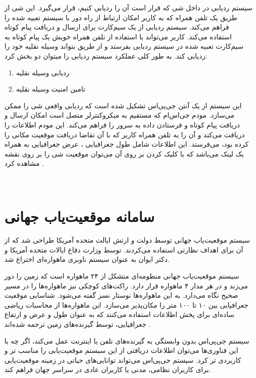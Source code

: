   
  سیستم ردیابی در داخل شی که قرار است آن را ردیابی کنیم، قرار می‌گیرد. این شی از طزیق یک تلفن همراه که به کاربر امکان ارتباط از راه دور با سیستم تعبیه شده را فراهم می‌کند. سیستم ردیابی از یک سیم‌کارت برای ارسال و دربافت پیام کوتاه استفاده می‌کند. کاربر می‌تواند با استفاده از تلفن همراه خویش یک پیام کوتاه به سیم‌کارت تعبیه شده در سیستم ردیابی بفرستد و از طریق بتواند وسیله نقلیه خود را ردیابی کند.
به طور کلی عملکرد سیستم ردیابی را میتوان دو بخش کرد:
  \begin{enumerate}
  	\item ردیابی وسیله نقلیه
	\item تامین امنیت وسیله نقلیه
  \end{enumerate}
این سیستم از یک آنتن جی‌پی‌اس تشکیل شده است که ردیابی واقعی شی را ممکن می‌سازد. مودم جی‌اس‌ام که مستقیم به میکروکنترلر متصل است امکان ارسال و دریافت پیام کوتاه و فرستادن داده به سرور را فراهم می‌کند. این مودم اطلاعات را دریافت می‌کند و آن را به تلفن همراه کاربر که با آن تقاضا دریافت موقعیت مکانی را کرده بود، می‌فرستد. این اطلاعات شامل طول جغرافیایی ، عرض جغرافیایی  به همراه یک لینک می‌باشد که با کلیک کردن بر روی آن می‌توان موقعیت شی را بر روی نقشه مشاهده کرد \cite{Mahamulkar2017}.
\\
\\
\\
\section{سامانه موقعیت‌یاب جهانی}
سیستم موقعیت‌‌یاب جهانی توسط دولت و ارتش ایالت متحده آمریکا طراحی شد که از آن برای اهداف نظارتی استفاده می‌کردند.  توسط وزارت دفاع ایالات متحده آمریکا و دکتر ایوان  به عنوان سیستم ناوبری ماهواره‌‌ای اختراع شد.


سیستم موقعیت‌یاب جهانی منظومه‌ای متشکل از ۲۴ ماهواره است که زمین را دور می‌زند و در هر مدار ۴ ماهواره قرار دارد. راکت‌های کوچکی نیز ماهواره‌ها را در مسیر صحیح نگاه می‌دارد. به این ماهواره‌ها نوستار نسز گفته می‌شود.
شناسایی موقعیت جغرافیایی بین ۱۰ تا ۱۰۰ متر را مکان‌پذیر می‌سازد. این ماهواره‌ها از محاسبات ریاضی ساده‌ای برای پخش اطلاعات استفاده می‌کنند که به عنوان طول و عرض و ارتفاع جغرافیایی، توسط گیرنده‌های زمین ترجمه شده‌اند \cite{gps}.


سیستم جی‌پی‌اس بدون وابستگی به گیرنده‌های تلفن یا اینترنت عمل می‌کند، اگر چه با این فناوری‌ها می‌توان اطلاعات دریافتی از این سیستم موقعیت‌یابی را مناسب تر و کاربردی تر کرد. سیستم جی‌پی‌اس می‌تواند توانایی‌های حیاتی در زمینه موقعیت‌یابی برای کاربران نظامی، مدنی یا کاربران عادی در سراسر جهان فراهم کند. 


